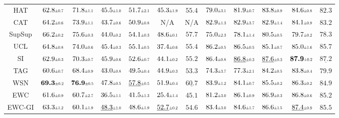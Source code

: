 \begin{table}[t]
{\begin{tabular}{crrrrrcrrrrc}
HAT &
$62.8\std{0.7}$ & $71.8\std{1.1}$ &
$45.5\std{1.0}$ & $51.7\std{2.1}$ &
$45.3\std{1.9}$ &
$55.4$ &
$79.0\std{3.1}$ & $81.9\std{0.7}$ &
$83.8\std{0.9}$ & $84.6\std{0.8}$ &
$82.3$ \\ 


CAT &
$64.2\std{0.6}$ & $73.9\std{1.1}$ &
$43.7\std{0.6}$ & $50.9\std{0.8}$ & 
\multicolumn{1}{c}{N/A} &
N/A &
$82.9\std{1.3}$ & $82.9\std{3.7}$ &
$82.9\std{1.4}$ & $84.1\std{0.9}$ &
$83.2$ \\ 


SupSup &
$66.2\std{0.2}$ & $75.6\std{0.3}$ &
$44.0\std{0.2}$ & $54.1\std{0.3}$ &
$48.6\std{0.1}$ &
$57.7$ &
$75.0\std{2.3}$ & $78.1\std{1.4}$ &
$80.5\std{0.5}$ & $79.7\std{0.2}$ &
$78.3$ \\


UCL &
$64.8\std{0.8}$ & $74.0\std{0.6}$ &
$45.4\std{0.3}$ & $55.1\std{0.5}$ &
$37.4\std{0.6}$ &
$55.4$ &
$86.2\std{0.5}$ & $86.5\std{0.5}$ &
$85.1\std{0.7}$ & $85.0\std{1.6}$ &
$85.7$ \\


SI &
$62.9\std{0.3}$ & $70.3\std{0.7}$ &
$45.9\std{0.6}$ & $52.6\std{0.7}$ &
$44.1\std{0.2}$ &
$55.2$ &
$86.4\std{0.8}$ & $\underline{86.8}\std{0.3}$ &
$\underline{87.6}\std{0.3}$ &  $\textbf{87.9}\std{0.2}$ &
$\underline{87.2}$ \\


TAG &
$60.6\std{0.7}$ & $68.4\std{0.9}$ &
$43.0\std{0.8}$ & $49.5\std{0.4}$ &
$44.9\std{0.3}$ &
$53.3$ &
$74.3\std{3.7}$ & $77.3\std{2.1}$ &
$84.2\std{0.5}$ & $83.8\std{0.4}$ &
$79.9$ \\


WSN &
$\textbf{69.3}\std{0.2}$ & $\textbf{76.9}\std{0.5}$ &
$47.8\std{0.5}$ & $\underline{57.8}\std{0.5}$ &
$51.9\std{0.4}$ &
$\underline{60.7}$ &
$83.9\std{1.2}$ & $84.1\std{0.7}$ &
$85.5\std{0.2}$ & $86.3\std{0.2}$ &
$84.9$ \\


EWC &
$61.6\std{0.9}$ & $60.7\std{2.7}$ & 
$36.5\std{1.1}$ & $41.5\std{1.3}$ & 
$25.4\std{1.4}$ &
$45.1$ &
$81.2\std{3.0}$ & $86.1\std{0.9}$ &
$86.9\std{0.3}$ & $86.8\std{0.6}$ &
$85.2$ \\ 


\hdashline


EWC-GI &
$63.3\std{1.2}$ & $60.1\std{1.9}$ &
$\underline{48.3}\std{1.0}$ & $48.6\std{1.9}$ &
$\underline{52.7}\std{0.2}$ &
$54.6$ &
$83.4\std{3.0}$ & $84.6\std{1.7}$ &
$86.6\std{1.5}$ & $\underline{87.4}\std{0.9}$ &
$85.5$ \\



\end{tabular}}
\end{table}
